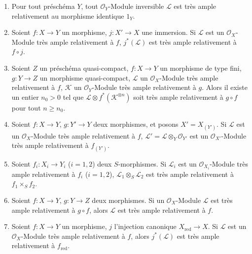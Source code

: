 \begin{proposition}[4.4.10]
\label{II.4.4.10-fr}
\begin{enumerate}
  \item[\rm{(i)}] Pour tout préschéma $Y$, tout $\mathcal{O}_Y$-Module
  inversible $\mathcal{L}$ est très ample relativement au morphisme identique
  $1_Y$.
  \item[\rm{(i \emph{bis})}] Soient $f:X\to Y$ un morphisme, $j:X'\to X$ une
  immersion. Si $\mathcal{L}$ est un $\mathcal{O}_X$-Module très ample
  relativement à $f$, $j^*(\mathcal{L})$ est très ample relativement à
  $f\circ j$.
  \item[\rm{(ii)}] Soient $Z$ un préschéma quasi-compact, $f:X\to Y$ un
  morphisme de type fini, $g:Y\to Z$ un morphisme quasi-compact,
  $\mathcal{L}$ un $\mathcal{O}_X$-Module très ample relativement à $f$,
  $\mathcal{K}$ un $\mathcal{O}_Y$-Module très ample relativement à $g$.
  Alors il existe un entier $n_0>0$ tel que
  $\mathcal{L}\otimes f^*(\mathcal{K}^{\otimes n})$ soit très ample
  relativement à $g\circ f$ pour tout $n\geq n_0$.
  \item[\rm{(iii)}] Soient $f:X\to Y$, $g:Y'\to Y$ deux morphismes, et posons
  $X'=X_{(Y')}$. Si $\mathcal{L}$ est un $\mathcal{O}_X$-Module très ample
  relativement à $f$, $\mathcal{L}'=\mathcal{L}\otimes_Y\mathcal{O}_{Y'}$
  est un $\mathcal{O}_{X'}$-Module très ample relativement à $f_{(Y')}$.
  \item[\rm{(iv)}] Soient $f_i:X_i\to Y_i$ ($i=1,2$) deux $S$-morphismes.
  Si $\mathcal{L}_i$ est un $\mathcal{O}_{X_i}$-Module très ample relativement
  à $f_i$ ($i=1,2$), $\mathcal{L}_1\otimes_S\mathcal{L}_2$ est très ample
  relativement à $f_1\times_Sf_2$.
  \item[\rm{(v)}] Soient $f:X\to Y$, $g:Y\to Z$ deux morphismes. Si un
  $\mathcal{O}_X$-Module $\mathcal{L}$ est très ample relativement à
  $g\circ f$, alors $\mathcal{L}$ est très ample relativement à $f$.
  \item[\rm{(vi)}] Soient $f:X\to Y$ un morphisme, $j$ l'injection canonique
  $X_{\mathrm{red}}\to X$. Si $\mathcal{L}$ est un $\mathcal{O}_X$-Module
  très ample relativement à $f$, alors $j^*(\mathcal{L})$ est très ample
  relativement à $f_{\mathrm{red}}$.
\end{enumerate}
\end{proposition}

